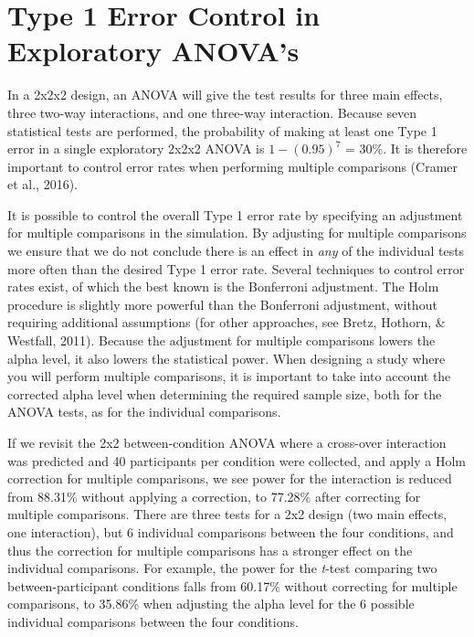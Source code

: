 \documentclass[
  ,jou,floatsintext]{apa6}
\begin{document}
\hypertarget{type-1-error-control-in-exploratory-anovas}{%
\section{Type 1 Error Control in Exploratory ANOVA's}\label{type-1-error-control-in-exploratory-anovas}}

In a 2x2x2 design, an ANOVA will give the test results for three main effects, three two-way interactions, and one three-way interaction.
Because seven statistical tests are performed, the probability of making at least one Type 1 error in a single exploratory 2x2x2 ANOVA is \(1-(0.95)^7\) = 30\%.
It is therefore important to control error rates when performing multiple comparisons (Cramer et al., 2016).

It is possible to control the overall Type 1 error rate by specifying an adjustment for multiple comparisons in the simulation.
By adjusting for multiple comparisons we ensure that we do not conclude there is an effect in \emph{any} of the individual tests more often than the desired Type 1 error rate.
Several techniques to control error rates exist, of which the best known is the Bonferroni adjustment.
The Holm procedure is slightly more powerful than the Bonferroni adjustment, without requiring additional assumptions (for other approaches, see Bretz, Hothorn, \& Westfall, 2011).
Because the adjustment for multiple comparisons lowers the alpha level, it also lowers the statistical power.
When designing a study where you will perform multiple comparisons, it is important to take into account the corrected alpha level when determining the required sample size, both for the ANOVA tests, as for the individual comparisons.

If we revisit the 2x2 between-condition ANOVA where a cross-over interaction was predicted and 40 participants per condition were collected, and apply a Holm correction for multiple comparisons, we see power for the interaction is reduced from 88.31\% without applying a correction, to 77.28\% after correcting for multiple comparisons.
There are three tests for a 2x2 design (two main effects, one interaction), but 6 individual comparisons between the four conditions, and thus the correction for multiple comparisons has a stronger effect on the individual comparisons.
For example, the power for the \emph{t}-test comparing two between-participant conditions falls from 60.17\% without correcting for multiple comparisons, to 35.86\% when adjusting the alpha level for the 6 possible individual comparisons between the four conditions.
\end{document}

